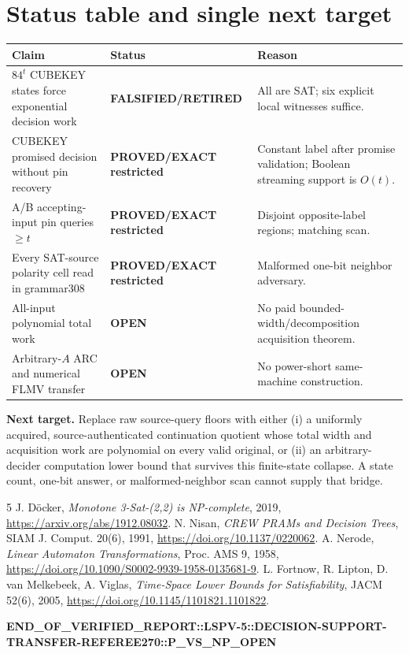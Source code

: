 \documentclass[11pt]{article}
\begin{document}
\section{Status table and single next target}
\begin{center}\scriptsize\begin{tabular}{p{.38\linewidth}p{.22\linewidth}p{.31\linewidth}}\toprule
Claim&Status&Reason\\\midrule
$84^t$ CUBEKEY states force exponential decision work&\textbf{FALSIFIED/RETIRED}&All are SAT; six explicit local witnesses suffice.\\
CUBEKEY promised decision without pin recovery&\textbf{PROVED/EXACT restricted}&Constant label after promise validation; Boolean streaming support is $O(t)$.\\
A/B accepting-input pin queries $\ge t$&\textbf{PROVED/EXACT restricted}&Disjoint opposite-label regions; matching scan.\\
Every SAT-source polarity cell read in grammar308&\textbf{PROVED/EXACT restricted}&Malformed one-bit neighbor adversary.\\
All-input polynomial total work&\textbf{OPEN}&No paid bounded-width/decomposition acquisition theorem.\\
Arbitrary-$A$ ARC and numerical FLMV transfer&\textbf{OPEN}&No power-short same-machine construction.\\\bottomrule
\end{tabular}\end{center}

\noindent\textbf{Next target.} Replace raw source-query floors with either (i) a uniformly acquired, source-authenticated continuation quotient whose total width and acquisition work are polynomial on every valid original, or (ii) an arbitrary-decider computation lower bound that survives this finite-state collapse.  A state count, one-bit answer, or malformed-neighbor scan cannot supply that bridge.

\begin{thebibliography}{5}
 J. D\"ocker, \emph{Monotone 3-Sat-(2,2) is NP-complete}, 2019, \url{https://arxiv.org/abs/1912.08032}.
 N. Nisan, \emph{CREW PRAMs and Decision Trees}, SIAM J. Comput. 20(6), 1991, \url{https://doi.org/10.1137/0220062}.
 A. Nerode, \emph{Linear Automaton Transformations}, Proc. AMS 9, 1958, \url{https://doi.org/10.1090/S0002-9939-1958-0135681-9}.
 L. Fortnow, R. Lipton, D. van Melkebeek, A. Viglas, \emph{Time-Space Lower Bounds for Satisfiability}, JACM 52(6), 2005, \url{https://doi.org/10.1145/1101821.1101822}.
\end{thebibliography}

\noindent\small\textbf{END\_OF\_VERIFIED\_REPORT::LSPV-5::DECISION-SUPPORT-\\TRANSFER-REFEREE270::P\_VS\_NP\_OPEN}
\end{document}
